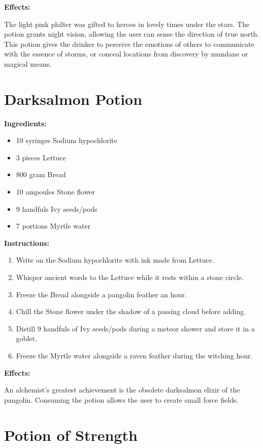 \documentclass{article}
\begin{document}
\textbf{Effects:}

The light pink philter was gifted to heroes in lovely times under the stars. The potion grants night vision, allowing the user can sense the direction of true north. This potion gives the drinker to perceive the emotions of others to communicate with the essence of storms, or conceal locations from discovery by mundane or magical means.

\newpage
\section*{Darksalmon Potion}

\textbf{Ingredients:}

\begin{itemize}
  \item 10 syringes Sodium hypochlorite
  \item 3 pieces Lettuce
  \item 800 gram Bread
  \item 10 ampoules Stone flower
  \item 9 handfuls Ivy seeds/pods
  \item 7 portions Myrtle water
\end{itemize}

\textbf{Instructions:}

\begin{enumerate}
  \item Write on the Sodium hypochlorite with ink made from Lettuce.
  \item Whisper ancient words to the Lettuce while it rests within a stone circle.
  \item Freeze the Bread alongside a pangolin feather an hour.
  \item Chill the Stone flower under the shadow of a passing cloud before adding.
  \item Distill 9 handfuls of Ivy seeds/pods during a meteor shower and store it in a goblet.
  \item Freeze the Myrtle water alongside a raven feather during the witching hour.
\end{enumerate}

\textbf{Effects:}

An alchemist's greatest achievement is the obsolete darksalmon elixir of the pangolin. Consuming the potion allows the user to create small force fields.

\newpage
\section*{Potion of Strength}
\end{document}
